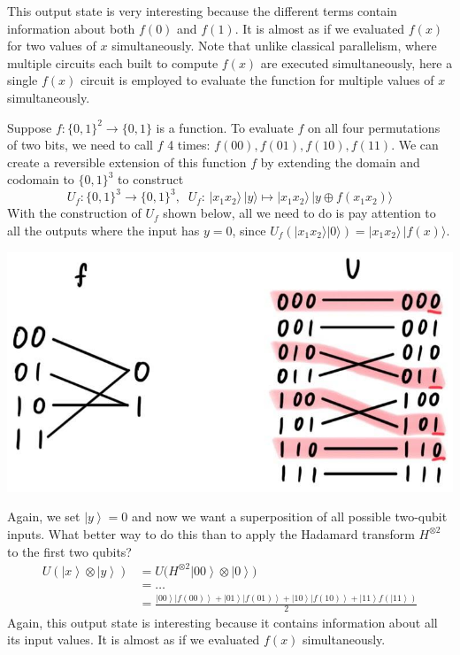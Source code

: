\documentclass{article}
\newcommand{\ket}[1]{\ensuremath{\left|#1\right\rangle}}
\begin{document}
\begin{example}
        This output state is very interesting because the different terms contain information about both $f(0)$ and $f(1)$. It is almost as if we evaluated $f(x)$ for two values of $x$ simultaneously. Note that unlike classical parallelism, where multiple circuits each built to compute $f(x)$ are executed simultaneously, here a single $f(x)$ circuit is employed to evaluate the function for multiple values of $x$ simultaneously.
      \end{example}

      \begin{example}
        Suppose $f: \{0, 1\}^2 \longrightarrow \{0, 1\}$ is a function. To evaluate $f$ on all four permutations of two bits, we need to call $f$ 4 times: $f(00), f(01), f(10), f(11)$. We can create a reversible extension of this function $f$ by extending the domain and codomain to $\{0, 1\}^3$ to construct
        \begin{equation} 
          U_f: \{0, 1\}^3 \longrightarrow \{0, 1\}^3, \;\; U_f: \, |x_1 x_2 \rangle\,|y\rangle \mapsto |x_1 x_2 \rangle\, |y \oplus f(x_1 x_2) \rangle
        \end{equation}
        With the construction of $U_f$ shown below, all we need to do is pay attention to all the outputs where the input has $y=0$, since $U_f (|x_1 x_2 \rangle |0\rangle) = |x_1 x_2 \rangle \, |f(x) \rangle$.
        \begin{center}
          \includegraphics[scale=0.3]{img/f_to_U_reversible.jpg}
        \end{center}
        Again, we set $\ket{y} = 0$ and now we want a superposition of all possible two-qubit inputs. What better way to do this than to apply the Hadamard transform $H^{\otimes 2}$ to the first two qubits? 
        \begin{align} 
          U (\ket{x} \otimes \ket{y}) & = U \big( H^{\otimes 2} \ket{00} \otimes \ket{0} \big) \\
                                      & = \ldots \\
                                      & = \frac{\ket{00} \ket{f(00)} + \ket{01} \ket{f(01)} + \ket{10} \ket{f(10)} + \ket{11} f(\ket{11})}{2}
        \end{align}
        Again, this output state is interesting because it contains information about all its input values. It is almost as if we evaluated $f(x)$ simultaneously.
      \end{example}
      
\end{document}
